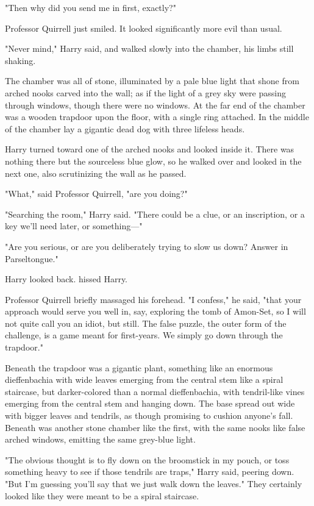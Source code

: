 "Then why did you send me in first, exactly?"

Professor Quirrell just smiled. It looked significantly more evil than usual.

"Never mind," Harry said, and walked slowly into the chamber, his limbs still
shaking.

The chamber was all of stone, illuminated by a pale blue light that shone from
arched nooks carved into the wall; as if the light of a grey sky were passing
through windows, though there were no windows. At the far end of the chamber
was a wooden trapdoor upon the floor, with a single ring attached. In the
middle of the chamber lay a gigantic dead dog with three lifeless heads.

Harry turned toward one of the arched nooks and looked inside it. There was
nothing there but the sourceless blue glow, so he walked over and looked in the
next one, also scrutinizing the wall as he passed.

"What," said Professor Quirrell, "are you doing?"

"Searching the room," Harry said. "There could be a clue, or an inscription, or
a key we'll need later, or something\mbox{---}"

"Are you serious, or are you deliberately trying to slow us down? Answer in
Parseltongue."

Harry looked back.  hissed Harry. 

Professor Quirrell briefly massaged his forehead. "I confess," he said, "that
your approach would serve you well in, say, exploring the tomb of Amon-Set, so
I will not quite call you an idiot, but still. The false puzzle, the outer form
of the challenge, is a game meant for first-years. We simply go down through
the trapdoor."

Beneath the trapdoor was a gigantic plant, something like an enormous
dieffenbachia with wide leaves emerging from the central stem like a spiral
staircase, but darker-colored than a normal dieffenbachia, with tendril-like
vines emerging from the central stem and hanging down. The base spread out wide
with bigger leaves and tendrils, as though promising to cushion anyone's fall.
Beneath was another stone chamber like the first, with the same nooks like
false arched windows, emitting the same grey-blue light.

"The obvious thought is to fly down on the broomstick in my pouch, or toss
something heavy to see if those tendrils are traps," Harry said, peering down.
"But I'm guessing you'll say that we just walk down the leaves." They certainly
looked like they were meant to be a spiral staircase.

